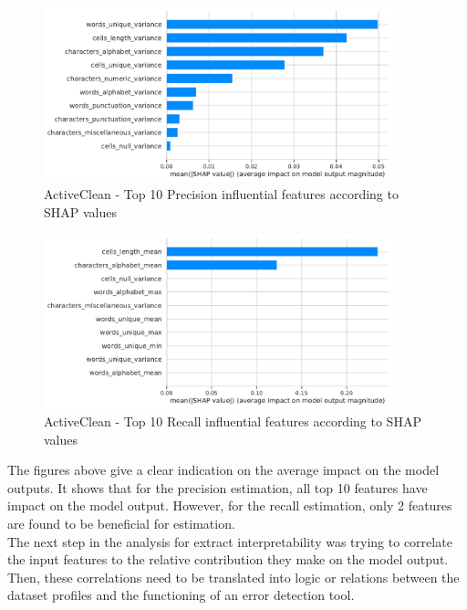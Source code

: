 \begin{figure}[H]
    \centering
    \includegraphics[width=0.9\textwidth]{thesis/Figures/RQ4/Shap_cell_prec_ActiveClean.pdf}
    \caption{ActiveClean - Top 10 Precision influential features according to SHAP values}
    \label{fig:feature_importance_prec_ActiveClean}
\end{figure}
\begin{figure}[H]
    \centering
    \includegraphics[width=0.9\textwidth]{thesis/Figures/RQ4/Shap_cell_rec_ActiveClean.pdf}
    \caption{ActiveClean - Top 10 Recall influential features according to SHAP values}
    \label{fig:feature_importance_rec_ActiveClean}
\end{figure}

The figures above give a clear indication on the average impact on the model outputs. It shows that for the precision estimation, all top 10 features have impact on the model output. However, for the recall estimation, only 2 features are found to be beneficial for estimation.
~\\The next step in the analysis for extract interpretability was trying to correlate the input features to the relative contribution they make on the model output. Then, these correlations need to be translated into logic or relations between the dataset profiles and the functioning of an error detection tool.


